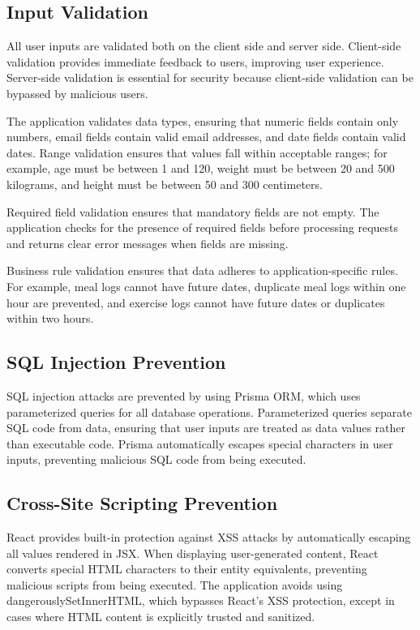 \subsection{Input Validation}

All user inputs are validated both on the client side and server side. Client-side validation provides immediate feedback to users, improving user experience. Server-side validation is essential for security because client-side validation can be bypassed by malicious users.

The application validates data types, ensuring that numeric fields contain only numbers, email fields contain valid email addresses, and date fields contain valid dates. Range validation ensures that values fall within acceptable ranges; for example, age must be between 1 and 120, weight must be between 20 and 500 kilograms, and height must be between 50 and 300 centimeters.

Required field validation ensures that mandatory fields are not empty. The application checks for the presence of required fields before processing requests and returns clear error messages when fields are missing.

Business rule validation ensures that data adheres to application-specific rules. For example, meal logs cannot have future dates, duplicate meal logs within one hour are prevented, and exercise logs cannot have future dates or duplicates within two hours.

\subsection{SQL Injection Prevention}

SQL injection attacks are prevented by using Prisma ORM, which uses parameterized queries for all database operations. Parameterized queries separate SQL code from data, ensuring that user inputs are treated as data values rather than executable code. Prisma automatically escapes special characters in user inputs, preventing malicious SQL code from being executed.

\subsection{Cross-Site Scripting Prevention}

React provides built-in protection against XSS attacks by automatically escaping all values rendered in JSX. When displaying user-generated content, React converts special HTML characters to their entity equivalents, preventing malicious scripts from being executed. The application avoids using dangerouslySetInnerHTML, which bypasses React's XSS protection, except in cases where HTML content is explicitly trusted and sanitized.

